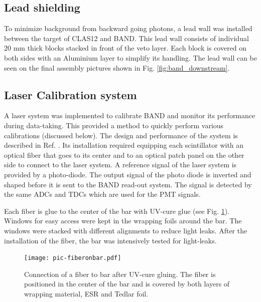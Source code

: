\documentclass[3p,final,twocolumn]{elsarticle}
\begin{document}
\subsection{Lead shielding}
To minimize background from backward going photons, a lead wall was installed between the target of CLAS12 and BAND. This lead wall consists of individual 20 \si{\milli\meter} thick blocks stacked in front of the veto layer. Each block is covered on both sides with an Aluminium layer to simplify its handling. The lead wall can be seen on the final assembly pictures shown in Fig. \ref{fig:band_downstream}.



\subsection{Laser Calibration system}
\label{sec:laserystem}
A laser system was implemented to calibrate BAND and monitor its performance during data-taking. This 
provided a method to quickly perform various calibrations (discussed below). The design and performance of the system is described in Ref. \cite{band-laser}. 
Its installation required equipping each scintillator with an optical fiber that goes to its center and to an optical patch panel on the other side to connect to the laser system.
A reference signal of the laser system is provided by a photo-diode. The output signal of the photo diode is inverted and shaped before it is sent to the BAND read-out system. The signal is detected by the same ADCs and TDCs which are used for the PMT signals.

Each fiber is glue to the center of the bar with UV-cure glue (see Fig. \ref{fig:pic-fiberonbar}). Windows for easy access were kept in the wrapping foils around the bar. The windows were stacked with different alignments to reduce light leaks. After the installation of the fiber, the bar was intensively tested for light-leaks.
\begin{figure}[tb]
	\centering
		\texttt{[image: pic-fiberonbar.pdf]}
	\caption{Connection of a fiber to bar after UV-cure gluing. The fiber is positioned in the center of the bar and is covered by both layers of wrapping material, ESR \cite{3MESR} and Tedlar foil.}
	\label{fig:pic-fiberonbar}
\end{figure}
\end{document}

